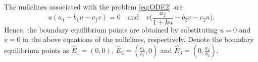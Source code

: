 \documentclass[10pt]{amsart}
\theoremstyle{definition}
\begin{document}
%	
%	
%	
%	
%	
%	
%	
%	
%	


	The nullclines associated with the problem \eqref{eq:ODE2} are
	\[ u(a_1 -b_1 u -c_1 v)=0 \quad \text{and} \quad  v \Big( \dfrac{a_2 }{1+ku}  -b_2 v -c_2 u\Big).\]
	Hence, the boundary equilibrium points are obtained by substituting $u=0$ and $v=0$ in the above equations of the nullclines, respectively. Denote the boundary equilibrium points as 
	$\widehat{E}_1=(0,0)$, $\widehat{E}_2=(\frac{a_1}{b_1},0)$ and  $\widehat{E}_3=(0,\frac{a_2}{b_2})$.
	
\end{document}
